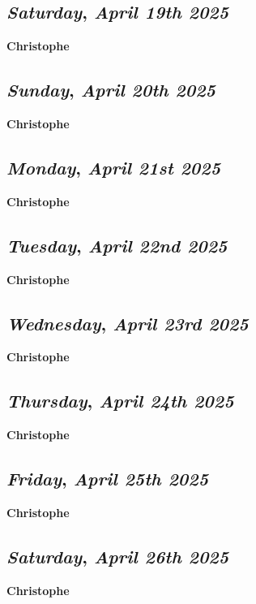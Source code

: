 \def\day{\textit{April 19th 2025}}
\def\weekday{\textit{Saturday}}
\subsection*{\weekday, \day}
\textbf {Christophe}

\def\day{\textit{April 20th 2025}}
\def\weekday{\textit{Sunday}}
\subsection*{\weekday, \day}
\textbf {Christophe}

\def\day{\textit{April 21st 2025}}
\def\weekday{\textit{Monday}}
\subsection*{\weekday, \day}
\textbf {Christophe}

\def\day{\textit{April 22nd 2025}}
\def\weekday{\textit{Tuesday}}
\subsection*{\weekday, \day}
\textbf {Christophe}

\def\day{\textit{April 23rd 2025}}
\def\weekday{\textit{Wednesday}}
\subsection*{\weekday, \day}
\textbf {Christophe}

\def\day{\textit{April 24th 2025}}
\def\weekday{\textit{Thursday}}
\subsection*{\weekday, \day}
\textbf {Christophe}

\def\day{\textit{April 25th 2025}}
\def\weekday{\textit{Friday}}
\subsection*{\weekday, \day}
\textbf {Christophe}

\def\day{\textit{April 26th 2025}}
\def\weekday{\textit{Saturday}}
\subsection*{\weekday, \day}
\textbf {Christophe}

\def\day{\textit{April 27th 2025}}
\def\weekday{\textit{Sunday}}
